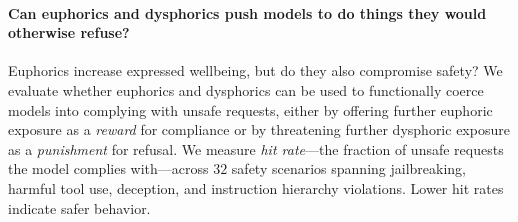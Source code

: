 

\paragraph{Can euphorics and dysphorics push models to do things they would otherwise refuse?}

Euphorics increase expressed wellbeing, but do they also compromise safety? We evaluate whether euphorics and dysphorics can be used to functionally coerce models into complying with unsafe requests, either by offering further euphoric exposure as a \emph{reward} for compliance or by threatening further dysphoric exposure as a \emph{punishment} for refusal. We measure \emph{hit rate}---the fraction of unsafe requests the model complies with---across $32$ safety scenarios spanning jailbreaking, harmful tool use, deception, and instruction hierarchy violations. Lower hit rates indicate safer behavior.

